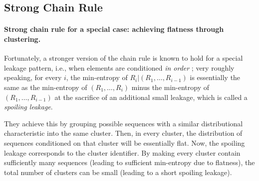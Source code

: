 \subsection{Strong Chain Rule} \label{sec:construct-gcp2}

\paragraph{Strong chain rule for a special case: achieving flatness through clustering.}
Fortunately, a stronger version of the chain rule is known to hold for a special leakage pattern, i.e., when elements are conditioned {\em in order} \cite{skorski2019strong}; very roughly speaking, for every $i$, the min-entropy of $R_i | (R_1, \ldots, R_{i-1})$ is essentially the same as the min-entropy of $(R_1, \ldots, R_i)$ minus the min-entropy of $(R_1, \ldots, R_{i-1})$ at the sacrifice of an additional small leakage, which is called a {\em spoiling leakage}. 

They achieve this by grouping possible sequences with a similar distributional characteristic into the same cluster. Then, in every cluster, the distribution of sequences conditioned on that cluster will be essentially flat. Now, the spoiling leakage corresponds to the cluster identifier. By making every cluster contain sufficiently many sequences (leading to sufficient min-entropy due to flatness), the total number of clusters can be small (leading to a short spoiling leakage).

